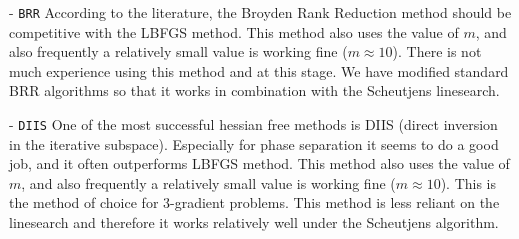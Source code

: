 \documentclass{article}
\begin{document}
\begin{itemize}



- {\tt BRR} According to the literature, the Broyden Rank Reduction method should be competitive with the LBFGS method. This method also uses the value of $m$, and also frequently a relatively small value is working fine ($m \approx 10$). There is not much experience using this method and at this stage. We have modified standard BRR algorithms so that it works in combination with the Scheutjens linesearch.

- {\tt DIIS} One of the most successful hessian free methods is DIIS (direct inversion in the iterative subspace). Especially for phase separation it seems to do a good job, and it often outperforms LBFGS method. This method also uses the value of $m$, and also frequently a relatively small value is working fine ($m \approx 10$). This is the method of choice for 3-gradient problems. This method is less reliant on the linesearch and therefore it works relatively well under the Scheutjens algorithm. 
  


\end{itemize}
\end{document}
